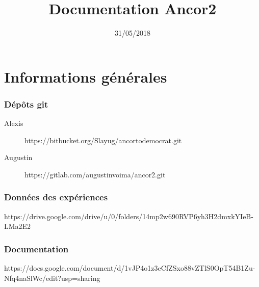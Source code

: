 \documentclass[a4paper,10pt]{report}
\author{}
\date{31/05/2018}
\title{Documentation Ancor2}
\begin{document}
 \maketitle
 \tableofcontents
 \chapter{Informations générales}
 \subsection{Dépôts git}
 \begin{description}
  \item [Alexis] https://bitbucket.org/Slayug/ancortodemocrat.git
  \item [Augustin] https://gitlab.com/augustinvoima/ancor2.git
 \end{description}
 
 \subsection{Données des expériences}
 https://drive.google.com/drive/u/0/folders/14mp2w690RVP6yh3H2dmxkYIeB-LMa2E2
 \subsection{Documentation}
 https://docs.google.com/document/d/1vJP4o1z3eCfZSxo88vZTlS0OpT54B1Zu-Nfq4naSlWc/edit?usp=sharing
 
\end{document}
